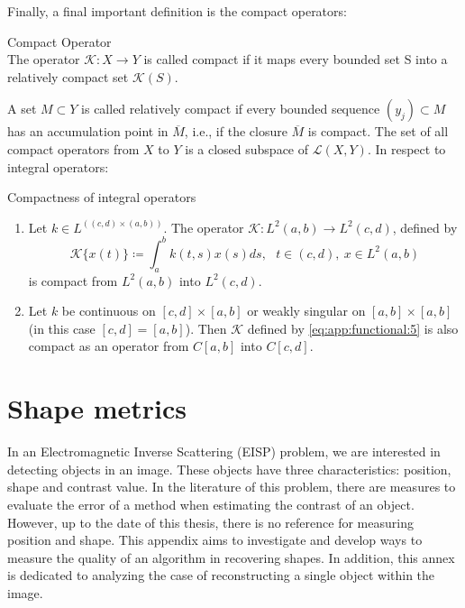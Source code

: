 			Finally, a final important definition is the compact operators:
			\begin{definition}\label{def:app:functional:7}
				Compact Operator\\
				The operator $\mathcal{K}:X\rightarrow Y$ is called compact if it maps every bounded set S into a relatively compact set $\mathcal{K}(S)$.
			\end{definition}

			A set $M\subset Y$  is called relatively compact if every bounded sequence $(y_j)\subset M$ has an accumulation point in $\overline{M}$, i.e., if the closure $\overline{M}$ is compact. The set of all compact operators from $X$ to $Y$ is a closed subspace of $\mathcal{L}(X,Y)$. In respect to integral operators:
			\begin{theorem}\label{the:app:functional:9}
				Compactness of integral operators
				\begin{enumerate}
					\item Let $k \in L^((c,d)\times(a,b))$. The operator $\mathcal{K} : L^2(a,b) \rightarrow L^2(c,d)$, defined by
					\begin{equation}
						\mathcal{K}\{x(t)\} \coloneqq \int_a^b k(t,s)x(s)ds, ~~~ t \in (c,d), ~ x \in L^2(a,b) \label{eq:app:functional:5}
					\end{equation}
					\noindent is compact from $L^2(a,b)$ into $L^2(c,d)$.
					\item Let $k$ be continuous on $[c,d]\times[a,b]$ or weakly singular on $[a,b]\times[a,b]$ (in this case $[c,d]=[a,b]$). Then $\mathcal{K}$ defined by \eqref{eq:app:functional:5} is also compact as an operator from $C[a,b]$ into $C[c,d]$.
				\end{enumerate}
			\end{theorem}

	\chapter{Shape metrics}\label{annex:zetas}

		In an Electromagnetic Inverse Scattering (EISP) problem, we are interested in detecting objects in an image. These objects have three characteristics: position, shape and contrast value. In the literature of this problem, there are measures to evaluate the error of a method when estimating the contrast of an object. However, up to the date of this thesis, there is no reference for measuring position and shape. This appendix aims to investigate and develop ways to measure the quality of an algorithm in recovering shapes. In addition, this annex is dedicated to analyzing the case of reconstructing a single object within the image.
		
